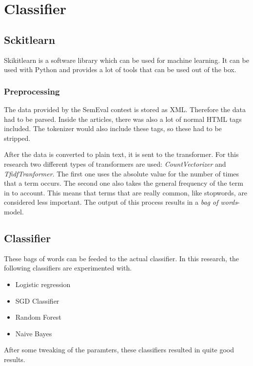 \section{Classifier}

\subsection{Sckitlearn}

Skikitlearn is a software library which can be used for machine learning. It can be used with Python and provides a lot of tools that can be used out of the box.

\subsubsection{Preprocessing}
The data provided by the SemEval contest is stored as XML. Therefore the data had to be parsed. Inside the articles, there was also a lot of normal HTML tags included. The tokenizer would also include these tags, so these had to be stripped. 

After the data is converted to plain text, it is sent to the transformer. For this research two different types of transformers are used: \textit{CountVectorizer} and \textit{TfidfTranformer}. The first one uses the absolute value for the number of times that a term occurs. The second one also takes the general frequency of the term in to account. This means that terms that are really common, like stopwords, are considered less important. The output of this process results in a \textit{bag of words}-model.

\subsection{Classifier}

These bags of words can be feeded to the actual classifier. In this research, the following classifiers are experimented with.

\begin{itemize}
	\item Logistic regression
	\item SGD Classifier
	\item Random Forest
	\item Naive Bayes
\end{itemize}

\noindent After some tweaking of the paramters, these classifiers resulted in quite good results. \\

